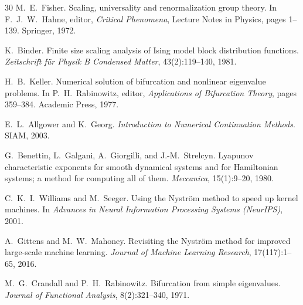 \documentclass[11pt]{article}
\theoremstyle{definition}
\begin{document}
\begin{thebibliography}{30}
M.~E.~Fisher.
\newblock Scaling, universality and renormalization group theory.
\newblock In F.~J.~W.~Hahne, editor, \emph{Critical Phenomena}, Lecture Notes in Physics, pages 1--139. Springer, 1972.

K.~Binder.
\newblock Finite size scaling analysis of {I}sing model block distribution functions.
\newblock \emph{Zeitschrift f{\"u}r Physik B Condensed Matter}, 43(2):119--140, 1981.

H.~B.~Keller.
\newblock Numerical solution of bifurcation and nonlinear eigenvalue problems.
\newblock In P.~H.~Rabinowitz, editor, \emph{Applications of Bifurcation Theory}, pages 359--384. Academic Press, 1977.

E.~L.~Allgower and K.~Georg.
\newblock \emph{Introduction to Numerical Continuation Methods}.
\newblock SIAM, 2003.

G.~Benettin, L.~Galgani, A.~Giorgilli, and J.-M.~Strelcyn.
\newblock Lyapunov characteristic exponents for smooth dynamical systems and for {H}amiltonian systems; a method for computing all of them.
\newblock \emph{Meccanica}, 15(1):9--20, 1980.

C.~K.~I.~Williams and M.~Seeger.
\newblock Using the {N}ystr{\"o}m method to speed up kernel machines.
\newblock In \emph{Advances in Neural Information Processing Systems (NeurIPS)}, 2001.

A.~Gittens and M.~W.~Mahoney.
\newblock Revisiting the {N}ystr{\"o}m method for improved large-scale machine learning.
\newblock \emph{Journal of Machine Learning Research}, 17(117):1--65, 2016.

M.~G.~Crandall and P.~H.~Rabinowitz.
\newblock Bifurcation from simple eigenvalues.
\newblock \emph{Journal of Functional Analysis}, 8(2):321--340, 1971.

\end{thebibliography}
\end{document}
